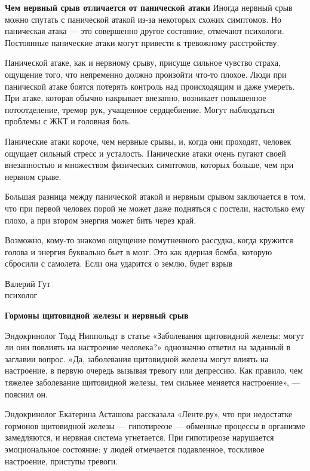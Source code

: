 \textbf{Чем нервный срыв отличается от панической атаки}
Иногда нервный срыв можно спутать с панической атакой из-за некоторых схожих симптомов. Но паническая атака — это совершенно другое состояние, отмечают психологи. Постоянные панические атаки могут привести к тревожному расстройству.

Панической атаке, как и нервному срыву, присуще сильное чувство страха, ощущение того, что непременно должно произойти что-то плохое. Люди при панической атаке боятся потерять контроль над происходящим и даже умереть. При атаке, которая обычно накрывает внезапно, возникает повышенное потоотделение, тремор рук, учащенное сердцебиение. Могут наблюдаться проблемы с ЖКТ и головная боль.

Панические атаки короче, чем нервные срывы, и, когда они проходят, человек ощущает сильный стресс и усталость. Панические атаки очень пугают своей внезапностью и множеством физических симптомов, которых больше, чем при нервном срыве.

Большая разница между панической атакой и нервным срывом заключается в том, что при первой человек порой не может даже подняться с постели, настолько ему плохо, а при втором энергия может бить через край.

\begin{fancyquotes}
    Возможно, кому-то знакомо ощущение помутненного рассудка, когда кружится голова и энергия буквально бьет в мозг. Это как ядерная бомба, которую сбросили с самолета. Если она ударится о землю, будет взрыв

    \begin{flushright}
        Валерий Гут
        \\
        психолог
    \end{flushright}
\end{fancyquotes}

\textbf{Гормоны щитовидной железы и нервный срыв}

Эндокринолог Тодд Ниппольдт в статье «Заболевания щитовидной железы: могут ли они повлиять на настроение человека?» однозначно ответил на заданный в заглавии вопрос. «Да, заболевания щитовидной железы могут влиять на настроение, в первую очередь вызывая тревогу или депрессию. Как правило, чем тяжелее заболевание щитовидной железы, тем сильнее меняется настроение», — пояснил он.

Эндокринолог Екатерина Асташова рассказала «Ленте.ру», что при недостатке гормонов щитовидной железы — гипотиреозе — обменные процессы в организме замедляются, и нервная система угнетается. При гипотиреозе нарушается эмоциональное состояние: у людей отмечается подавленное, тоскливое настроение, приступы тревоги.

